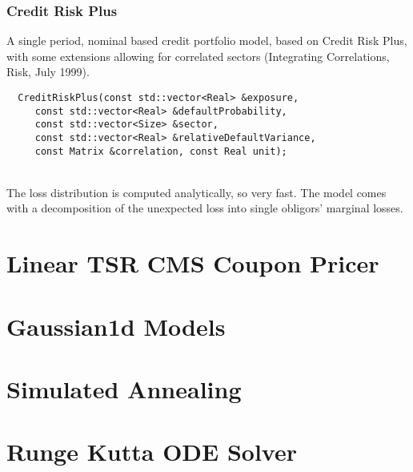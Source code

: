 \documentclass{beamer}
\begin{document}
\begin{frame}[fragile]
\frametitle{Credit Risk Plus}
A single period, nominal based credit portfolio model, based on Credit Risk Plus, with some extensions allowing for correlated sectors (Integrating Correlations, Risk, July 1999).
\vspace{2mm}
\begin{verbatim}
  CreditRiskPlus(const std::vector<Real> &exposure,
     const std::vector<Real> &defaultProbability,
     const std::vector<Size> &sector,
     const std::vector<Real> &relativeDefaultVariance,
     const Matrix &correlation, const Real unit);
\end{verbatim}
\\
\vspace{2mm}
The loss distribution is computed analytically, so very fast. The model comes with a decomposition of the unexpected loss into single obligors' marginal losses.
\end{frame}

\section{Linear TSR CMS Coupon Pricer}




\section{Gaussian1d Models}







\section{Simulated Annealing}



\section{Runge Kutta ODE Solver}
\end{document}
